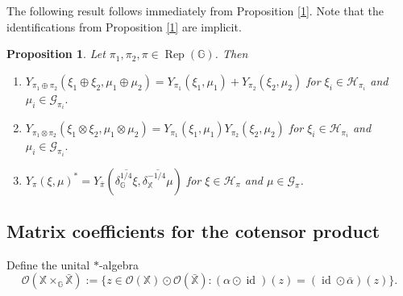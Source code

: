 \documentclass[reqno]{amsart}
\numberwithin{equation}{section}
\newtheorem{Prop}[Theorem]{Proposition}
\newcommand\XGX{\X\times_\G \bar{\X}}
\DeclareMathOperator{\id}{\mathrm{id}}
\DeclareMathOperator{\Rep}{\mathrm{Rep}}
\newcommand{\mcG}{\mathcal{G}}
\newcommand{\mcH}{\mathcal{H}}
\newcommand{\mcO}{\mathcal{O}}
\newcommand{\G}{\mathbb{G}}
\newcommand{\X}{\mathbb{X}}
\begin{document}
The following result follows immediately from Proposition \ref{1}. Note that the identifications from Proposition \ref{1} are implicit.

\begin{Prop}\label{2}
    Let $\pi_1, \pi_2, \pi\in \Rep(\G)$. Then 
    \begin{enumerate}
        \item $Y_{\pi_1\oplus \pi_2}(\xi_1\oplus \xi_2, \mu_1\oplus \mu_2)= Y_{\pi_1}(\xi_1, \mu_1)+ Y_{\pi_2}(\xi_2, \mu_2)$ for $\xi_i\in \mcH_{\pi_i}$ and $\mu_i \in \mcG_{\pi_i}.$
        \item\vspace{-1.5mm} $Y_{\pi_1\otimes \pi_2}(\xi_1\otimes \xi_2, \mu_1\otimes \mu_2) = Y_{\pi_1}(\xi_1, \mu_1)Y_{\pi_2}(\xi_2, \mu_2)$  for $\xi_i \in \mcH_{\pi_i}$ and $\mu_i \in \mcG_{\pi_i}.$
        \item\vspace{-1.5mm} $Y_{\pi}(\xi, \mu)^* = Y_{\bar{\pi}}(\overline{\delta_\G^{1/4}\xi}, \overline{\delta_\X^{-1/4}\mu})$ for $\xi \in \mcH_\pi$ and $\mu \in \mcG_\pi$.
    \end{enumerate}
\end{Prop}

\subsection{Matrix coefficients for the cotensor product}

Define the unital $*$-algebra
$$\mcO(\XGX):= \{z\in \mcO(\X)\odot \mcO(\bar{\X}): (\alpha\odot \id)(z) = (\id \odot\bar{\alpha})(z)\}.$$
\end{document}
